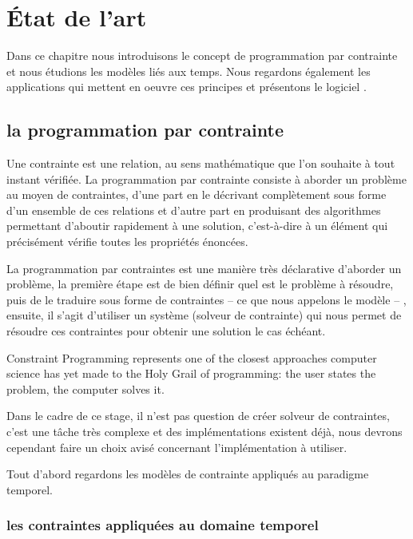 \chapter{État de l'art}
Dans ce chapitre nous introduisons le concept de programmation par contrainte et nous étudions les modèles liés aux temps. Nous regardons également les applications qui mettent en oeuvre ces principes et présentons le logiciel \iscore{}.
\section{la programmation par contrainte}
\begin{citeauteur}
Une contrainte est une relation, au sens mathématique que l’on souhaite à tout instant vérifiée. La programmation par contrainte consiste à aborder un problème au moyen de contraintes, d’une part en le décrivant complètement sous forme d’un ensemble de ces relations et d’autre part en produisant des algorithmes permettant d’aboutir rapidement à une solution, c'est-à-dire à un élément qui précisément vérifie toutes les propriétés énoncées.
\end{citeauteur}

La programmation par contraintes est une manière très déclarative d'aborder un problème, la première étape est de bien définir quel est le problème à résoudre, puis de le traduire sous forme de contraintes -- ce que nous appelons le modèle -- , ensuite, il s'agit d'utiliser un système (solveur de contrainte) qui nous permet de résoudre ces contraintes pour obtenir une solution le cas échéant.

\begin{citeauteur}
Constraint Programming represents one of the closest approaches computer science has yet made to the Holy Grail of programming: the user states the problem, the computer solves it.
\end{citeauteur}

Dans le cadre de ce stage, il n'est pas question de créer solveur de contraintes, c'est une tâche très complexe et des implémentations existent déjà, nous devrons cependant faire un choix avisé concernant l'implémentation à utiliser.

Tout d'abord regardons les modèles de contrainte appliqués au paradigme temporel.

\subsection{les contraintes appliquées au domaine temporel}


